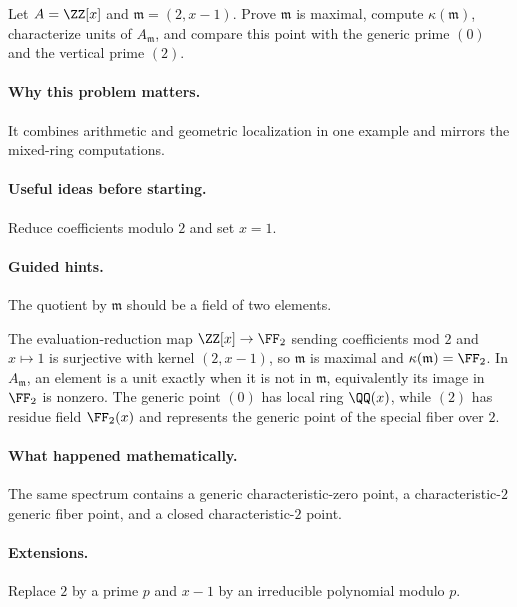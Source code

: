 \begin{problem}
Let $A=\ZZ[x]$ and $\mathfrak m=(2,x-1)$.  Prove $\mathfrak m$ is maximal, compute $\kappa(\mathfrak m)$, characterize units of $A_{\mathfrak m}$, and compare this point with the generic prime $(0)$ and the vertical prime $(2)$.
\end{problem}

\paragraph{Why this problem matters.}
It combines arithmetic and geometric localization in one example and mirrors the mixed-ring computations.

\paragraph{Useful ideas before starting.}
Reduce coefficients modulo $2$ and set $x=1$.

\paragraph{Guided hints.}
The quotient by $\mathfrak m$ should be a field of two elements.

\begin{solution}
The evaluation-reduction map $\ZZ[x]\to\FF_2$ sending coefficients mod $2$ and $x\mapsto1$ is surjective with kernel $(2,x-1)$, so $\mathfrak m$ is maximal and $\kappa(\mathfrak m)=\FF_2$.  In $A_{\mathfrak m}$, an element is a unit exactly when it is not in $\mathfrak m$, equivalently its image in $\FF_2$ is nonzero.  The generic point $(0)$ has local ring $\QQ(x)$, while $(2)$ has residue field $\FF_2(x)$ and represents the generic point of the special fiber over $2$.
\end{solution}

\paragraph{What happened mathematically.}
The same spectrum contains a generic characteristic-zero point, a characteristic-$2$ generic fiber point, and a closed characteristic-$2$ point.

\paragraph{Extensions.}
Replace $2$ by a prime $p$ and $x-1$ by an irreducible polynomial modulo $p$.
